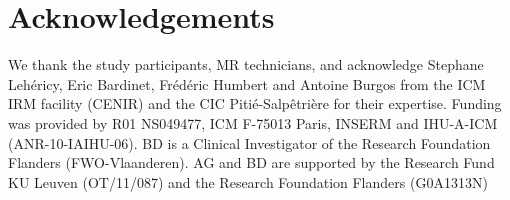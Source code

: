 \section{Acknowledgements}

We thank the study participants, MR technicians, and acknowledge Stephane Lehéricy, Eric Bardinet, Frédéric Humbert and
Antoine Burgos from the ICM IRM facility (CENIR) and the CIC
Pitié-Salpêtrière for their expertise. Funding was provided by R01 NS049477, ICM F-75013 Paris, INSERM and IHU-A-ICM
(ANR-10-IAIHU-06). BD is a Clinical Investigator of the Research Foundation Flanders (FWO-Vlaanderen). AG and BD are supported by the Research Fund KU Leuven (OT/11/087) and the Research Foundation Flanders (G0A1313N)